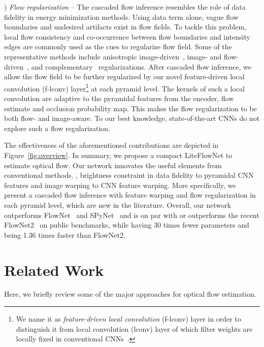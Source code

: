 \documentclass[10pt,twocolumn,letterpaper]{article}
\begin{document}
) \textit{Flow regularization} -- 
%
The cascaded flow inference resembles the role of data fidelity in energy minimization methods. Using data term alone, vague flow boundaries and undesired artifacts exist in flow fields. To tackle this problem, local flow consistency and co-occurrence between flow boundaries and intensity edges are commonly used as the cues to regularize flow field. Some of the representative methods include anisotropic image-driven~\cite{Werlberger09}, image- and flow-driven~\cite{Sun08}, and complementary~\cite{Zimmer11} regularizations.
%
After cascaded flow inference, we allow the flow field to be further regularized by our novel feature-driven local convolution (f-lconv) layer\footnote{We name it as \textit{feature-driven local convolution} (f-lconv) layer in order to distinguish it from local convolution (lconv) layer of which filter weights are locally fixed in conventional CNNs~\cite{Taigman14}.} at each pyramid level.
%
The kernels of such a local convolution are adaptive to the pyramidal features from the encoder, flow estimate and occlusion probability map. This makes the flow regularization to be both flow- and image-aware.  
%
To our best knowledge, state-of-the-art CNNs do not explore such a flow regularization.

The effectiveness of the aforementioned contributions are depicted in Figure~\ref{fig:overview}. 
%
In summary, we propose a compact LiteFlowNet to estimate optical flow. Our network innovates the useful elements from conventional methods. \eg, brightness constraint in data fidelity to pyramidal CNN features and image warping to CNN feature warping. More specifically, we present a cascaded flow inference with feature warping and flow regularization in each pyramid level, which are new in the literature. 
%
Overall, our network outperforms FlowNet~\cite{Fischer15} and SPyNet~\cite{Ranjan17} and is on par with or outperforms the recent FlowNet2~\cite{Ilg17} on public benchmarks, while having 30 times fewer parameters and being 1.36 times faster than FlowNet2.

\section{Related Work}
\label{sec:related_work}
%
Here, we briefly review some of the major approaches for optical flow estimation.
\end{document}
